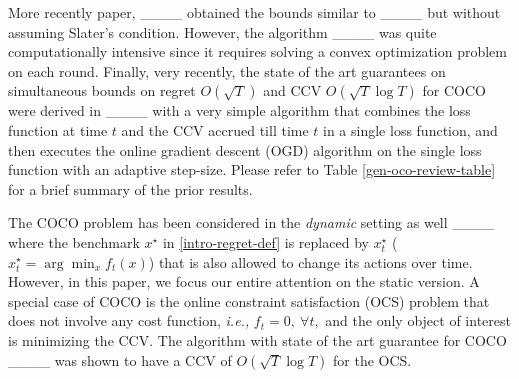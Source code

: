 More recently paper, ____ obtained the bounds similar to ____ but without assuming Slater's condition. However, the algorithm ____ was quite computationally intensive since it requires solving a convex optimization problem on each round. 
Finally, very recently, the state of the art guarantees on simultaneous bounds on regret $O (\sqrt{T})$ and CCV $O (\sqrt{T}\log T)$ for COCO were derived in ____ with a very simple algorithm that combines the loss function at time $t$ and the CCV accrued till time $t$ in a single loss function, and then executes the online gradient descent (OGD) algorithm on the single loss function with an adaptive step-size.
Please refer to Table \ref{gen-oco-review-table} for a brief summary of the prior results.



The COCO problem has been considered in the {\it dynamic} setting as well  ____ where the benchmark $x^\star$ in \eqref{intro-regret-def} is replaced by $x_t^\star$ ($x_t^\star = \arg \min_x f_t(x)$) that is also allowed to change its actions over time. However, in this paper, we focus our entire attention on the static version.
A special case of COCO is the 
online constraint satisfaction (OCS) problem that does not involve any cost function, \emph{i.e.,} $f_t=0, \ \forall t,$ and the only object of interest is minimizing the CCV. The algorithm with state of the art guarantee for COCO ____ was shown to have a CCV of $O(\sqrt{T}\log T)$ for the OCS.